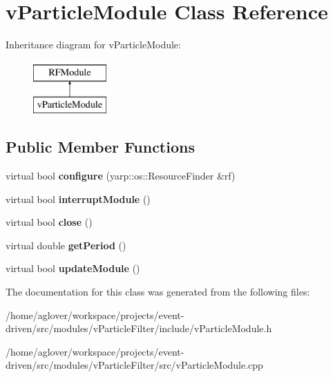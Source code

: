 \hypertarget{classvParticleModule}{}\section{v\+Particle\+Module Class Reference}
\label{classvParticleModule}
Inheritance diagram for v\+Particle\+Module\+:\begin{figure}[H]
\begin{center}
\leavevmode
\includegraphics[height=2.000000cm]{classvParticleModule}
\end{center}
\end{figure}
\subsection*{Public Member Functions}
\begin{DoxyCompactItemize}
\item 
virtual bool {\bfseries configure} (yarp\+::os\+::\+Resource\+Finder \&rf)\hypertarget{classvParticleModule_a50220d0e8c348cbb887924def82ec78b}{}\label{classvParticleModule_a50220d0e8c348cbb887924def82ec78b}

\item 
virtual bool {\bfseries interrupt\+Module} ()\hypertarget{classvParticleModule_ae0dbee0680f7006c09a2413d13cbb4fb}{}\label{classvParticleModule_ae0dbee0680f7006c09a2413d13cbb4fb}

\item 
virtual bool {\bfseries close} ()\hypertarget{classvParticleModule_a622f526fc7e2e194b301ff1fa6a362bb}{}\label{classvParticleModule_a622f526fc7e2e194b301ff1fa6a362bb}

\item 
virtual double {\bfseries get\+Period} ()\hypertarget{classvParticleModule_acee72c3ad5f6eddb580fbf57f0cb9d7e}{}\label{classvParticleModule_acee72c3ad5f6eddb580fbf57f0cb9d7e}

\item 
virtual bool {\bfseries update\+Module} ()\hypertarget{classvParticleModule_ae1973b925b09372518b4922b8f033363}{}\label{classvParticleModule_ae1973b925b09372518b4922b8f033363}

\end{DoxyCompactItemize}


The documentation for this class was generated from the following files\+:\begin{DoxyCompactItemize}
\item 
/home/aglover/workspace/projects/event-\/driven/src/modules/v\+Particle\+Filter/include/v\+Particle\+Module.\+h\item 
/home/aglover/workspace/projects/event-\/driven/src/modules/v\+Particle\+Filter/src/v\+Particle\+Module.\+cpp\end{DoxyCompactItemize}
